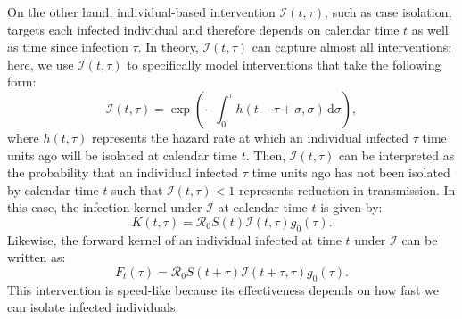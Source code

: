 \documentclass[12pt]{article}
\newcommand{\Rx}[1]{\ensuremath{{\mathcal R}_{#1}}\xspace}
\newcommand{\Ro}{\Rx{0}}
\newcommand{\dd}[1]{\ensuremath{\, \mathrm{d}#1}}
\newcommand{\dsigma}{\dd{\sigma}}
\newcommand{\II}{{\mathcal I}}
\begin{document}
On the other hand, individual-based intervention $\II(t, \tau)$, such as case isolation, targets each infected individual and therefore depends on calendar time $t$ as well as time since infection $\tau$.
In theory, $\II(t, \tau)$ can capture almost all interventions; here, we use $\II(t, \tau)$ to specifically model interventions that take the following form:
\begin{equation}
\II(t, \tau) = \exp \left(- \int_0^\tau h(t-\tau+\sigma, \sigma) \dsigma \right),
\end{equation}
where $h(t, \tau)$ represents the hazard rate at which an individual infected $\tau$ time units ago will be isolated at calendar time $t$.
Then, $\II(t,\tau)$ can be interpreted as the probability that an individual infected $\tau$ time units ago has not been isolated by calendar time $t$ such that $\II(t, \tau) < 1$ represents reduction in transmission.
In this case, the infection kernel under $\II$ at calendar time $t$ is given by:
\begin{equation}
K(t, \tau) = \Ro S(t) \II(t, \tau) g_0(\tau).
\end{equation}
Likewise, the forward kernel of an individual infected at time $t$ under $\II$ can be written as:
\begin{equation}
F_t(\tau) = \Ro S(t+\tau) \II(t+\tau, \tau) g_0(\tau).
\end{equation}
This intervention is speed-like because its effectiveness depends on how fast we can isolate infected individuals.
\end{document}

